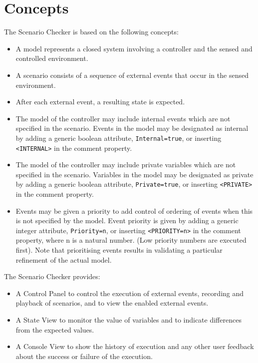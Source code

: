 
\section{Concepts}
\label{sec:concepts}

The Scenario Checker is based on the following concepts:
\begin{itemize}
		\item A model represents a closed system involving a controller and the sensed and controlled environment.
		\item A scenario consists of a sequence of external events that occur in the sensed environment. 
		\item After each external event, a resulting state is expected.
		\item The model of the controller may include internal events which are not specified in the scenario. 
		Events in the model may be designated as internal by adding a generic boolean attribute, \texttt{Internal=true}, or inserting \texttt{<INTERNAL>} in the comment property.
		\item The model of the controller may include private variables which are not specified in the scenario.
		Variables in the model may be designated as private by adding a generic boolean attribute, \texttt{Private=true}, or inserting \texttt{<PRIVATE>} in the comment property.
		\item Events may be given a priority to add control of ordering of events when this is not specified by the model. 
		Event priority is given by adding a generic integer attribute, \texttt{Priority=n}, or inserting \texttt{<PRIORITY=n>} in the comment property, where n is a natural number.
		(Low priority numbers are executed first).
		Note that prioritising events results in validating a particular refinement of the actual model.
\end{itemize}
	
The Scenario Checker provides:
\begin{itemize}
	\item A Control Panel to control the execution of external events, recording and playback of scenarios, and to view the enabled external events.
	\item A State View to monitor the value of variables and to indicate differences from the expected values.
	\item A Console View to show the history of execution and any other user feedback about the success or failure of the execution.
\end{itemize}



